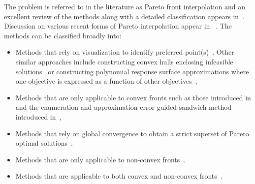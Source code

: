 The problem is referred to in the literature as Pareto front interpolation and an excellent review of the methods along with a detailed classification appears in~\cite{ruzika2005approximation}. Discussion on various recent forms of Pareto interpolation appear in ~\cite{hartikainen2011constructing}. The methods can be classified broadly into: 

\begin{itemize} 
	\item Methods that rely on visualization to identify preferred point(s)~\cite{monz2008pareto,lotov2008visualizing}. Other similar approaches include constructing convex hulls enclosing infeasible solutions~\cite{missoum2007convex} or constructing polynomial response surface approximations {\color{blue}where one objective is expressed as a function of other objectives~\cite{goel2007response}},  
	\item Methods that are only applicable to convex fronts such as those introduced in \cite{monz2006pareto,eskelinen2010pareto} and the enumeration and approximation error guided sandwich method introduced in~\cite{bokrantzdual},
	\item {\color{blue} Methods that rely on global convergence to obtain a strict superset of Pareto optimal solutions~\cite{lovison11singular,lovison2013mo,lovison2015lip}}.
	\item Methods that are only applicable to non-convex fronts~\cite{berezkin2006hybrid}. 
	\item {\color{blue}Methods that are applicable to both convex and non-convex fronts~\cite{hartikainen2010computationally,hartikainen2012paint,hartikainen2011demonstrating,hartikainen2014paint,martin2005approximating,hillermeier2001homo,hillermeier2001nmo,wiecek2016mo,kuhn2016box}}.
\end{itemize}

